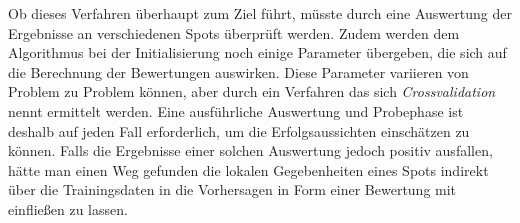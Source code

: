 Ob dieses Verfahren überhaupt zum Ziel führt, müsste durch eine
Auswertung der Ergebnisse an verschiedenen Spots überprüft
werden. Zudem werden dem Algorithmus bei der Initialisierung noch
einige Parameter übergeben, die sich auf die Berechnung der
Bewertungen auswirken. Diese Parameter variieren von Problem zu
Problem können, aber durch ein Verfahren das sich
\textit{Crossvalidation} nennt ermittelt werden. Eine ausführliche
Auswertung und Probephase ist deshalb auf jeden Fall erforderlich, um
die Erfolgsaussichten einschätzen zu können. Falls die Ergebnisse
einer solchen Auswertung jedoch positiv ausfallen, hätte man einen Weg
gefunden die lokalen Gegebenheiten eines Spots indirekt über die
Trainingsdaten in die Vorhersagen in Form einer Bewertung mit
einfließen zu lassen.

